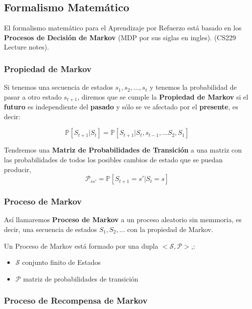 \documentclass[
  a4paper,
  DIV=11,
  numbers=noendperiod]{scrreprt}
\providecommand{\tightlist}{%
  \setlength{\itemsep}{0pt}\setlength{\parskip}{0pt}}\usepackage{longtable,booktabs,array}
\begin{document}
\subsection{Formalismo Matemático}\label{formalismo-matemuxe1tico}

El formalismo matemático para el Aprendizaje por Refuerzo está basado en
los \textbf{Procesos de Decisión de Markov} (MDP por sus siglas en
ingles). (CS229 Lecture notes).

\subsubsection{Propiedad de Markov}\label{propiedad-de-markov}

Si tenemos una secuencia de estados \(s_1, s_2, ..., s_t\) y tenemos la
probabilidad de pasar a otro estado \(s_{t+1}\), diremos que se cumple
la \textbf{Propiedad de Markov} si el \textbf{futuro} es independiente
del \textbf{pasado} y sólo se ve afectado por el \textbf{presente}, es
decir:

\[
\mathbb P[S_{t+1}| S_t] = \mathbb P[ S_{t+1}| S_t, s_{t-1}, ... S_2, S_1]
\]

Tendremos una \textbf{Matriz de Probabilidades de Transición} a una
matriz con las probabilidades de todos los posibles cambios de estado
que se puedan producir,
\[\mathcal P_{ss'}=\mathbb P[S_{t+1}=s'|S_t = s]\]

\subsubsection{Proceso de Markov}\label{proceso-de-markov}

Así llamaremos \textbf{Proceso de Markov} a un proceso aleatorio sin
memmoria, es decir, una secuencia de estados \(S_1, S_2, …\) con la
propiedad de Markov.

Un Proceso de Markov está formado por una dupla
\(<\mathcal S,\mathcal P>\),:

\begin{itemize}
\tightlist
\item
  \(\mathcal S\) conjunto finito de Estados
\item
  \(\mathcal P\) matriz de probabilidades de transición
\end{itemize}

\subsubsection{Proceso de Recompensa de
Markov}\label{proceso-de-recompensa-de-markov}
\end{document}
